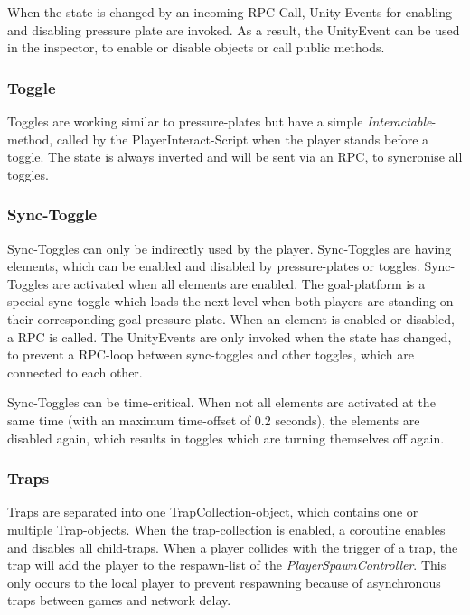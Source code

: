 When the state is changed by an incoming RPC-Call, Unity-Events for enabling and disabling pressure plate are invoked. As a result, the UnityEvent can be used in the inspector, to enable or disable objects or call public methods.

\subsubsection{Toggle}

Toggles are working similar to pressure-plates but have a simple \textit{Interactable}-method, called by the PlayerInteract-Script when the player stands before a toggle. The state is always inverted and will be sent via an RPC, to syncronise all toggles.


\subsubsection{Sync-Toggle}

Sync-Toggles can only be indirectly used by the player.
Sync-Toggles are having elements, which can be enabled and disabled by pressure-plates or toggles. Sync-Toggles are activated when all elements are enabled. The goal-platform is a special sync-toggle which loads the next level when both players are standing on their corresponding goal-pressure plate.
When an element is enabled or disabled, a RPC is called.
The UnityEvents are only invoked when the state has changed, to prevent a RPC-loop between sync-toggles and other toggles, which are connected to each other.

Sync-Toggles can be time-critical. When not all elements are activated at the same time (with an maximum time-offset of 0.2 seconds), the elements are disabled again, which results in toggles which are turning themselves off again.

\subsubsection{Traps}

Traps are separated into one TrapCollection-object, which contains one or multiple Trap-objects.
When the trap-collection is enabled, a coroutine enables and disables all child-traps. When a player collides with the trigger of a trap, the trap will add the player to the respawn-list of the \textit{PlayerSpawnController}. This only occurs to the local player to prevent respawning because of asynchronous traps between games and network delay.


